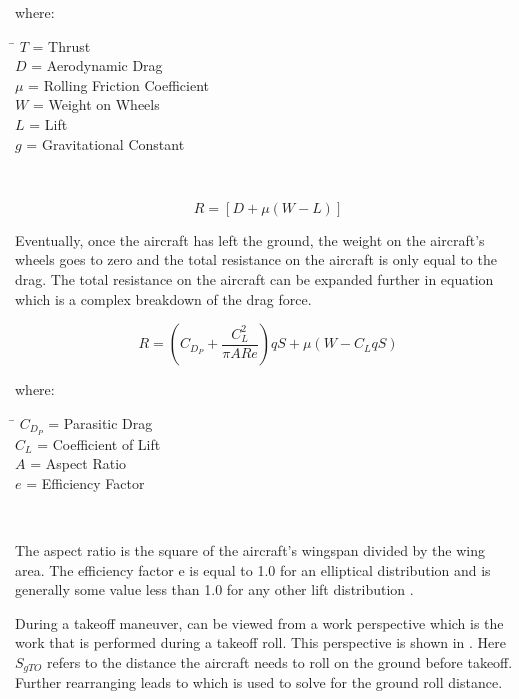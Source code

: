\documentclass[conf]{new-aiaa}
\begin{document}
where: 
\begin{tabbing}
\= \kill
\indent $T$\> \indent = Thrust\\
\indent $D$\> \indent = Aerodynamic Drag\\
\indent $\mu$\> \indent = Rolling Friction Coefficient\\
\indent $W$\> \indent = Weight on Wheels\\
\indent $L$\> \indent = Lift\\
\indent $g$\> \indent = Gravitational Constant\\
\end{tabbing}\

\begin{equation} \label{resistance}
\ R = [D + \mu(W-L)]
\end{equation}

Eventually, once the aircraft has left the ground, the weight on the aircraft's wheels goes to zero and the total resistance on the aircraft is only equal to the drag. The total resistance on the aircraft can be expanded further in equation  which is a complex breakdown of the drag force.

\begin{equation} \label{expandresistance}
\ R = (C_{D_P} + \dfrac{C_{L}^2}{\pi ARe})qS + \mu(W-C_LqS)
\end{equation}

where: 
\begin{tabbing}
\= \kill
\indent $C_{D_P}$\> \indent = Parasitic Drag\\
\indent $C_L$\> \indent = Coefficient of Lift\\
\indent $A$\> \indent = Aspect Ratio \\
\indent $e$\> \indent = Efficiency Factor\\

\end{tabbing}\

The aspect ratio is the square of the aircraft's wingspan divided by the wing area. The efficiency factor e is equal to 1.0 for an elliptical distribution and is generally some value less than 1.0 for any other lift distribution \cite{NASA}. 

During a takeoff maneuver,  can be viewed from a work perspective which is the work that is performed during a takeoff roll. This perspective is shown in . Here \(S_{gTO}\) refers to the distance the aircraft needs to roll on the ground before takeoff. Further rearranging  leads to  which is used to solve for the ground roll distance.
\end{document}
